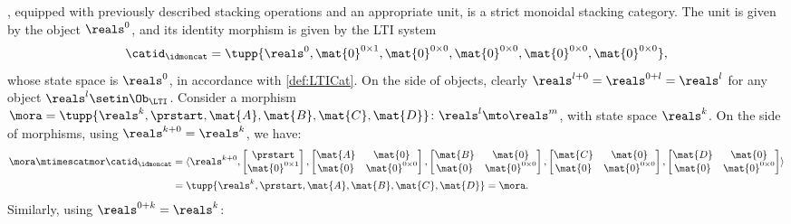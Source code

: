 \begin{example}
    \LTI, equipped with previously described stacking operations and an appropriate unit, is a strict monoidal stacking category.
    The unit is given by the object $\reals^0$, and its identity morphism is given by the LTI system
    \begin{equation*}
        \catid_\idmoncat=\tupp{\reals^0, \mat{0}^{0\times 1}, \mat{0}^{0\times 0}, \mat{0}^{0\times 0}, \mat{0}^{0\times 0},\mat{0}^{0\times 0}},
    \end{equation*}
    whose state space is $\reals^0$, in accordance with \cref{def:LTICat}.
    On the side of objects, clearly $\reals^{l+0}=\reals^{0+l}=\reals^l$ for any object $\reals^l\setin \Ob_\LTI$.
    Consider a morphism $\mora = \tupp{\reals^k, \prstart, \mat{A}, \mat{B}, \mat{C}, \mat{D}} \colon \reals^l\mto \reals^m$, with state space $\reals^k$.
    On the side of morphisms, using $\reals^{k+0} = \reals^k$, we have:
    \begin{equation*}
        \begin{aligned}
            \mora \mtimescatmor \catid_\idmoncat & =
            \langle \reals^{k+0}, \begin{bmatrix}\prstart \\ \mat{0}^{0\times 1}\end{bmatrix},
            \begin{bmatrix}\mat{A}&\mat{0}\\ \mat{0}&\mat{0}^{0\times 0}\end{bmatrix},
            \begin{bmatrix}\mat{B}&\mat{0}\\ \mat{0}&\mat{0}^{0\times 0}\end{bmatrix},
            \begin{bmatrix}\mat{C}&\mat{0}\\ \mat{0}&\mat{0}^{0\times 0}\end{bmatrix},
            \begin{bmatrix}\mat{D}&\mat{0}\\ \mat{0}&\mat{0}^{0\times 0}\end{bmatrix}\rangle \\
                                                 & =\tupp{\reals^k, \prstart, \mat{A}, \mat{B}, \mat{C}, \mat{D}} = \mora.
        \end{aligned}
    \end{equation*}
    Similarly, using $\reals^{0+k} = \reals^k$:
    \begin{equation*}
        \begin{aligned}

\end{aligned}
\end{equation*}
\end{example}
